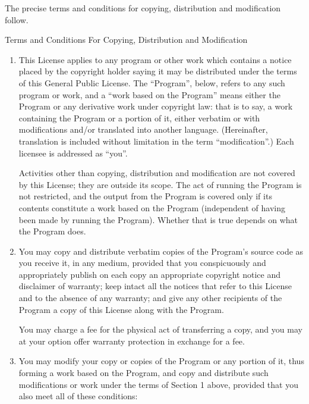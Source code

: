\documentclass[a4paper,11pt]{book}
\begin{document}
The precise terms and conditions for copying, distribution and
modification follow.

\begin{center}
	{\Large \sc Terms and Conditions For Copying, Distribution and
		Modification}
\end{center}


\begin{enumerate}
	
	\addtocounter{enumi}{-1}
	
	\item 
	
	This License applies to any program or other work which contains a notice
	placed by the copyright holder saying it may be distributed under the
	terms of this General Public License.  The ``Program'', below, refers to
	any such program or work, and a ``work based on the Program'' means either
	the Program or any derivative work under copyright law: that is to say, a
	work containing the Program or a portion of it, either verbatim or with
	modifications and/or translated into another language.  (Hereinafter,
	translation is included without limitation in the term ``modification''.)
	Each licensee is addressed as ``you''.
	
	Activities other than copying, distribution and modification are not
	covered by this License; they are outside its scope.  The act of
	running the Program is not restricted, and the output from the Program
	is covered only if its contents constitute a work based on the
	Program (independent of having been made by running the Program).
	Whether that is true depends on what the Program does.
	
	\item You may copy and distribute verbatim copies of the Program's source
	code as you receive it, in any medium, provided that you conspicuously
	and appropriately publish on each copy an appropriate copyright notice
	and disclaimer of warranty; keep intact all the notices that refer to
	this License and to the absence of any warranty; and give any other
	recipients of the Program a copy of this License along with the Program.
	
	You may charge a fee for the physical act of transferring a copy, and you
	may at your option offer warranty protection in exchange for a fee.
	
	\item
	
	You may modify your copy or copies of the Program or any portion
	of it, thus forming a work based on the Program, and copy and
	distribute such modifications or work under the terms of Section 1
	above, provided that you also meet all of these conditions:
	

\end{enumerate}
\end{document}
